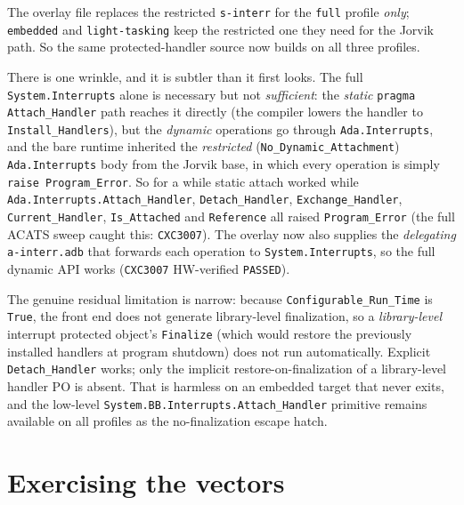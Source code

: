 The overlay file replaces the restricted \texttt{s-interr} for the \texttt{full}
profile \emph{only}; \texttt{embedded} and \texttt{light-tasking} keep the
restricted one they need for the Jorvik path. So the same protected-handler
source now builds on all three profiles.

There is one wrinkle, and it is subtler than it first looks. The full
\texttt{System.Interrupts} alone is necessary but not \emph{sufficient}: the
\emph{static} \texttt{pragma Attach\_Handler} path reaches it directly (the
compiler lowers the handler to \texttt{Install\_Handlers}), but the \emph{dynamic}
operations go through \texttt{Ada.Interrupts}, and the bare runtime inherited the
\emph{restricted} (\texttt{No\_Dynamic\_Attachment}) \texttt{Ada.Interrupts} body
from the Jorvik base, in which every operation is simply \texttt{raise
Program\_Error}. So for a while static attach worked while
\texttt{Ada.Interrupts.Attach\_Handler}, \texttt{Detach\_Handler},
\texttt{Exchange\_Handler}, \texttt{Current\_Handler}, \texttt{Is\_Attached} and
\texttt{Reference} all raised \texttt{Program\_Error} (the full ACATS sweep caught
this: \texttt{CXC3007}). The overlay now also supplies the \emph{delegating}
\texttt{a-interr.adb} that forwards each operation to \texttt{System.Interrupts},
so the full dynamic API works (\texttt{CXC3007} HW-verified \texttt{PASSED}).

The genuine residual limitation is narrow: because \texttt{Configurable\_Run\_Time}
is \texttt{True}, the front end does not generate library-level finalization, so a
\emph{library-level} interrupt protected object's \texttt{Finalize} (which would
restore the previously installed handlers at program shutdown) does not run
automatically. Explicit \texttt{Detach\_Handler} works; only the implicit
restore-on-finalization of a library-level handler PO is absent. That is harmless
on an embedded target that never exits, and the low-level
\texttt{System.BB.Interrupts.Attach\_Handler} primitive remains available on all
profiles as the no-finalization escape hatch.

\section{Exercising the vectors}

